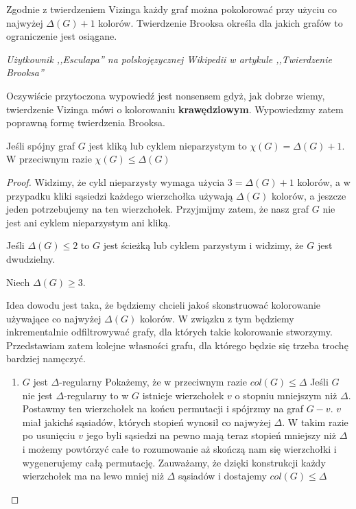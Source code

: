 \epigraph{
	Zgodnie z twierdzeniem Vizinga każdy graf można pokolorować przy użyciu co najwyżej $\Delta(G)+1$ kolorów. Twierdzenie Brooksa określa dla jakich grafów to ograniczenie jest osiągane.
}{\textit{
		Użytkownik ,,Esculapa'' na polskojęzycznej Wikipedii w artykule ,,Twierdzenie Brooksa''}}

Oczywiście przytoczona wypowiedź jest nonsensem gdyż, jak dobrze wiemy, twierdzenie Vizinga mówi o kolorowaniu \textbf{krawędziowym}.
Wypowiedzmy zatem poprawną formę twierdzenia Brooksa.

\begin{theorem}[Brooks]
	Jeśli spójny graf $G$ jest kliką lub cyklem nieparzystym to $\chi(G) = \Delta(G) + 1$.
	W przeciwnym razie $\chi(G) \leq \Delta(G)$
\end{theorem}

\begin{proof}
	Widzimy, że cykl nieparzysty wymaga użycia $3 = \Delta(G) + 1$ kolorów,
	a w przypadku kliki sąsiedzi każdego wierzchołka używają $\Delta(G)$ kolorów, a jeszcze jeden potrzebujemy na ten wierzchołek. Przyjmijmy zatem, że nasz graf $G$ nie jest
	ani cyklem nieparzystym ani kliką.

	Jeśli $\Delta(G) \leq 2$ to $G$ jest ścieżką lub cyklem parzystym i widzimy, że $G$ jest dwudzielny.

	Niech $\Delta(G) \geq 3$.

	Idea dowodu jest taka, że będziemy chcieli jakoś skonstruować kolorowanie używające co najwyżej $\Delta(G)$ kolorów. W związku z tym będziemy inkrementalnie odfiltrowywać grafy, dla których takie kolorowanie stworzymy.
	Przedstawiam zatem kolejne własności grafu, dla którego będzie się trzeba trochę bardziej namęczyć.

	\begin{enumerate}
		\item $G$ jest $\Delta$-regularny
		      Pokażemy, że w przeciwnym razie $col(G) \leq \Delta$
		      Jeśli $G$ nie jest $\Delta$-regularny to w $G$ istnieje wierzchołek $v$ o stopniu mniejszym niż $\Delta$.
		      Postawmy ten wierzchołek na końcu permutacji i spójrzmy na graf $G - v$.
		      $v$ miał jakichś sąsiadów, których stopień wynosił co najwyżej $\Delta$.
		      W takim razie po usunięciu $v$ jego byli sąsiedzi na pewno mają teraz stopień mniejszy niż $\Delta$
		      i możemy powtórzyć całe to rozumowanie aż skończą nam się wierzchołki i wygenerujemy całą permutację.
		      Zauważamy, że dzięki konstrukcji każdy wierzchołek ma na lewo mniej niż $\Delta$ sąsiadów i dostajemy $col(G) \leq \Delta$


\end{enumerate}
\end{proof}
